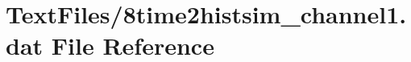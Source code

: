 \hypertarget{8time2histsim__channel1_8dat}{}\section{Text\+Files/8time2histsim\+\_\+channel1.dat File Reference}
\label{8time2histsim__channel1_8dat}

